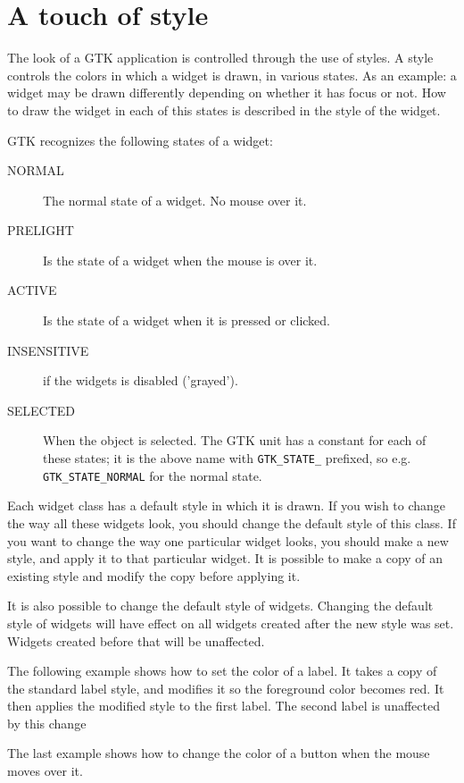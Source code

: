 \documentclass[10pt]{article}
\begin{document}
\section{A touch of style}
The look of a GTK application is controlled through the use of styles. A
style controls the colors in which a widget is drawn, in various states.
As an example: a widget may be drawn differently depending on whether it 
has focus or not. How to draw the widget in each of this states is described
in the style of the widget.

GTK recognizes the following states of a widget:
\begin{description}
\item[NORMAL] The normal state of a widget. No mouse over it.
\item[PRELIGHT] Is the state of a widget when the mouse is over it.
\item[ACTIVE] Is the state of a widget when it is pressed or
clicked.
\item[INSENSITIVE] if the widgets is disabled ('grayed').
\item[SELECTED] When the object is selected.
The GTK unit has a constant for each of these states; it is the above name
with \lstinline|GTK_STATE_| prefixed, so e.g. \lstinline|GTK_STATE_NORMAL|
for the normal state.

\end{description}


Each widget class has a default style in which it is drawn. If you wish to
change the way all these widgets look, you should change the default style
of this class. If you want to change the way one particular widget looks,
you should make a new style, and apply it to that particular widget. It is
possible to make a copy of an existing style and modify the copy before
applying it.

It is also possible to change the default style of widgets. Changing the
default style of widgets will have effect on all widgets created after the
new style was set. Widgets created before that will be unaffected.

The following example shows how to set the color of a label. It takes a
copy of the standard label style, and modifies it so the foreground color
becomes red. It then applies the modified style to the first label.
The second label is unaffected by this change


The last example shows how to change the color of a button when the mouse
moves over it.

\end{document}
